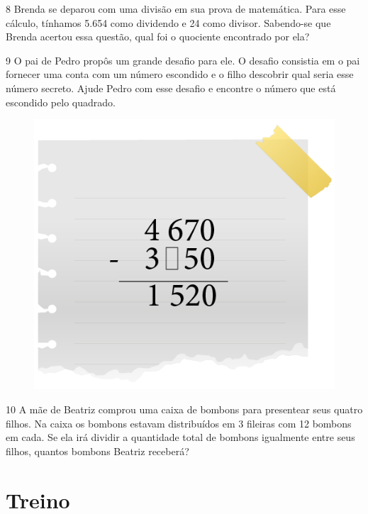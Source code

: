 \bigskip
\bigskip
\bigskip
\bigskip
\bigskip

\num{8} Brenda se deparou com uma divisão em sua prova de matemática. Para
esse cálculo, tínhamos 5.654 como dividendo e 24 como divisor. Sabendo-se
que Brenda acertou essa questão, qual foi o quociente encontrado por ela?


\pagebreak

\num{9} O pai de Pedro propôs um grande desafio para ele. O desafio
consistia em o pai fornecer uma conta com um número escondido e o filho descobrir qual seria esse número secreto. Ajude Pedro com esse
desafio e encontre o número que está escondido pelo quadrado.

\begin{figure}[htpb!]
\centering
\includegraphics[width=.4\textwidth]{../ilustracoes/MAT5/SAEB_5ANO_MAT_figura21.png}
\end{figure}


\bigskip
\bigskip
\bigskip
\bigskip

\num{10} A mãe de Beatriz comprou uma caixa de bombons para presentear seus
quatro filhos. Na caixa os bombons estavam distribuídos em 3 fileiras
com 12 bombons em cada. Se ela irá dividir a quantidade total de bombons
igualmente entre seus filhos, quantos bombons Beatriz receberá?

\begin{mdframed}[linewidth=2pt,linecolor=salmao]
\mbox{}\vspace*{6cm}
\end{mdframed}

\pagebreak

\section{Treino}

